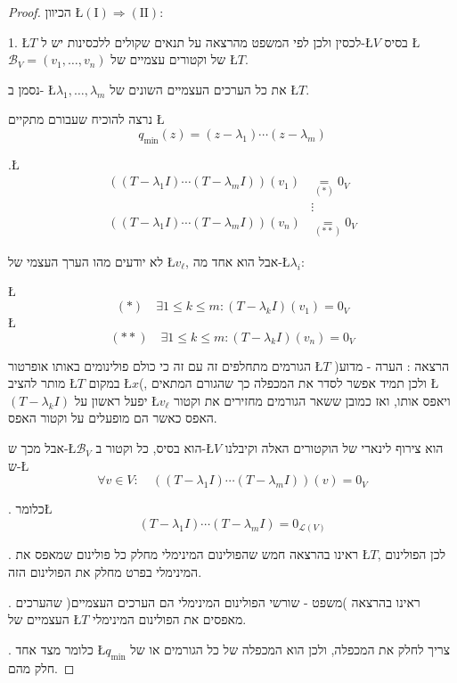 \documentclass[english,hebrew]{article}
\begin{document}
\begin{proof}
הכיוון \L{$(\text{I})\Rightarrow(\text{II})$}:

1. \L{$T$} לכסין ולכן לפי המשפט מהרצאה {\endL} על תנאים
שקולים ללכסינות יש ל-\L{$V$} בסיס \L{$\mathcal{B}_{V}=(v_{1},\dots,v_{n})$}
של וקטורים עצמיים של \L{$T$}.

נסמן ב- \L{$\lambda_{1},\dots,\lambda_{m}$} את כל הערכים העצמיים
השונים של \L{$T$}.

נרצה להוכיח שעבורם מתקיים \L{%
\[
q_{\min}(z)=(z-\lambda_{1})\cdots(z-\lambda_{m})
\]
}%

{\endL}.\L{%
\begin{align*}
\left((T-\lambda_{1}I)\cdots(T-\lambda_{m}I)\right)\left(v_{1}\right) & \underset{\left(*\right)}{=}0_{V}\\
 & \vdots\\
\left((T-\lambda_{1}I)\cdots(T-\lambda_{m}I)\right)\left(v_{n}\right) & \underset{\left(**\right)}{=}0_{V}
\end{align*}
}%

לא יודעים מהו הערך העצמי של \L{$v_{\ell}$}, אבל הוא אחד מה-\L{$\lambda_{i}$}:

\L{%
\[
\left(*\right)\quad\exists1\le k\le m:(T-\lambda_{k}I)\left(v_{1}\right)=0_{V}
\]
}%
\L{%
\[
\left(**\right)\quad\exists1\le k\le m:(T-\lambda_{k}I)\left(v_{n}\right)=0_{V}
\]
}%

הגורמים מתחלפים זה עם זה כי כולם פולינומים באותו אופרטור \L{$T$}
)הרצאה {\endL}: הערה - מדוע מותר להציב \L{$T$} במקום \L{$x$}(,
ולכן תמיד אפשר לסדר את המכפלה כך שהגורם המתאים \L{$(T-\lambda_{k}I)$}
יפעל ראשון על \L{$v_{\ell}$} ויאפס אותו, ואז כמובן ששאר הגורמים מחזירים
את וקטור האפס כאשר הם מופעלים על וקטור האפס.

אבל מכך ש-\L{$\mathcal{B}_{V}$} הוא בסיס, כל וקטור ב-\L{$V$} הוא
צירוף לינארי של הוקטורים האלה וקיבלנו ש-\L{%
\[
\forall v\in V:\quad\left((T-\lambda_{1}I)\cdots(T-\lambda_{m}I)\right)\left(v\right)=0_{V}
\]
}%

{\endL}. כלומר\L{%
\[
(T-\lambda_{1}I)\cdots(T-\lambda_{m}I)=0_{\mathcal{L}(V)}
\]
}%

{\endL}. ראינו בהרצאה חמש שהפולינום המינימלי מחלק כל פולינום
שמאפס את \L{$T$}, לכן הפולינום המינימלי בפרט מחלק את הפולינום הזה.

{\endL}. ראינו בהרצאה {\endL} )משפט - שורשי הפולינום
המינימלי הם הערכים העצמיים( שהערכים העצמיים של \L{$T$} מאפסים את
הפולינום המינימלי.

{\endL}. כלומר מצד אחד \L{$q_{\min}$} צריך לחלק את המכפלה,
ולכן הוא המכפלה של כל הגורמים או של חלק מהם.


\end{proof}
\end{document}
